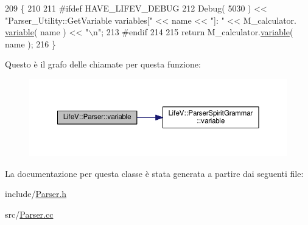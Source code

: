 \begin{DoxyCode}
209 \{
210 
211 \textcolor{preprocessor}{#ifdef HAVE\_LIFEV\_DEBUG}
212 \textcolor{preprocessor}{}    Debug( 5030 ) << \textcolor{stringliteral}{"Parser\_Utility::GetVariable    variables["} << name << \textcolor{stringliteral}{"]: "} << M\_calculator.
      \hyperlink{classLifeV_1_1ParserSpiritGrammar_a768e48421db190a4eba5144932ddc4f6}{variable}( name ) << \textcolor{stringliteral}{"\(\backslash\)n"};
213 \textcolor{preprocessor}{#endif}
214 \textcolor{preprocessor}{}
215     \textcolor{keywordflow}{return} M\_calculator.\hyperlink{classLifeV_1_1ParserSpiritGrammar_a768e48421db190a4eba5144932ddc4f6}{variable}( name );
216 \}
\end{DoxyCode}


Questo è il grafo delle chiamate per questa funzione\-:
\nopagebreak
\begin{figure}[H]
\begin{center}
\leavevmode
\includegraphics[width=350pt]{classLifeV_1_1Parser_a9fa902c13c73a3b1bc6db2b5e5c5c93d_cgraph}
\end{center}
\end{figure}




La documentazione per questa classe è stata generata a partire dai seguenti file\-:\begin{DoxyCompactItemize}
\item 
include/\hyperlink{Parser_8h}{Parser.\-h}\item 
src/\hyperlink{Parser_8cc}{Parser.\-cc}\end{DoxyCompactItemize}

